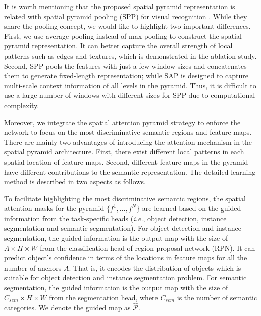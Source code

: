 \documentclass[runningheads]{llncs}
\def\ie{{\em i.e.}}
\begin{document}
It is worth mentioning that the proposed spatial pyramid representation is related with spatial pyramid pooling (SPP) for visual recognition \cite{DBLP:journals/pami/HeZR015}. While they share the pooling concept, we would like to highlight two important differences. First, we use average pooling instead of max pooling to construct the spatial pyramid representation. It can better capture the overall strength of local patterns such as edges and textures, which is demonstrated in the ablation study. Second, SPP pools the features with just a few window sizes and concatenates them to generate fixed-length representation; while SAP is designed to capture multi-scale context information of all levels in the pyramid. Thus, it is difficult to use a large number of windows with different sizes for SPP due to computational complexity.

{}
Moreover, we integrate the spatial attention pyramid strategy to enforce the network to focus on the most discriminative semantic regions and feature maps. There are mainly two advantages of introducing the attention mechanism in the spatial pyramid architecture. First, there exist different local patterns in each spatial location of feature maps. Second, different feature maps in the pyramid have different contributions to the semantic representation. The detailed learning method is described in two aspects as follows.

To facilitate highlighting the most discriminative semantic regions, the spatial attention masks for the pyramid $\{f^1,\dots,f^N\}$ are learned based on the guided information from the task-specific heads (\ie, object detection, instance segmentation and semantic segmentation). For object detection and instance segmentation, the guided information is the output map with the size of $A\times H \times W$ from the classification head of region proposal network (RPN). It can predict object's confidence in terms of the locations in feature maps for all the number of anchors $A$. That is, it encodes the distribution of objects which is suitable for object detection and instance segmentation problem. For semantic segmentation, the guided information is the output map with the size of $C_{sem}\times H \times W$ from the segmentation head, where $C_{sem}$ is the number of semantic categories. We denote the guided map as $\mathcal{\hat{P}}$.
\end{document}
